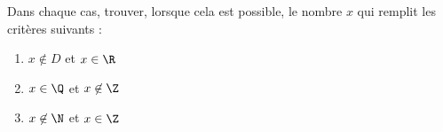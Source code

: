 
Dans chaque cas, trouver, lorsque cela est possible, le nombre $x$ qui remplit les critères suivants :
 
\begin{enumerate}
\item $x \not\in D$ et $x \in \R$ 
\item $x \in \Q$ et $x \not\in \Z$ 
\item $x \not\in \N$ et $x \in \Z$ 
\end{enumerate}